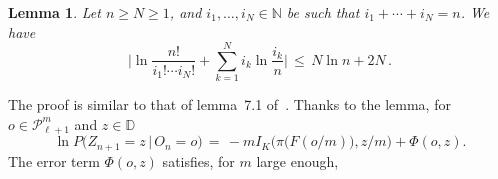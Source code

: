 \documentclass[a4paper,12pt]{article}
\newtheorem{lemma}[theorem]{Lemma}
\theoremstyle{definition}
\theoremstyle{remark}
\def \cD {\mathcal{D}}
\def \cP {\mathcal{P}}
\def \b {\beta}
\def \t {\theta}
\def \s {\sigma}
\def \dD {\mathbb{D}}
\def \N {\mathbb{N}}
\def \pml {\cP^m_{\ell +1}}
\begin{document}
\begin{lemma}\label{ldmultinom}
Let
$n\geq N\geq1$,
and
$i_1,\dots,i_N\in \N$ be 
such that
$i_1+\cdots+i_N=n$.
We have
$$\Bigg|
\ln\frac{n!}{i_1!\cdots i_N!}
+\sum_{k=1}^N i_k\ln\frac{i_k}{n}
\Bigg|\,\leq\,
N\ln n+2N\,.$$
\end{lemma}
The proof is similar to that of lemma~7.1 of~\cite{CerfWF}.
\color{black}
Thanks to the lemma, for $o\in\pml$ and $z\in\dD$
$$
\ln P\big(
Z_{n+1}=z\,\big|\,
O_n=o
\big)\,=\,-mI_K\Big(\pi\big(F(o/m)\big),z/m\Big)+\Phi(o,z).
$$
The error term
$\Phi(o,z)$
satisfies, for $m$ large enough,
\end{document}
